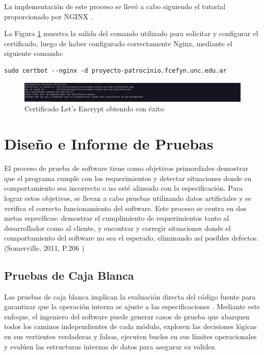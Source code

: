 La implementación de este proceso se llevó a cabo siguiendo el tutorial proporcionado por NGINX \cite{nginx-lestencript}.


La Figura \ref{fig:certificate-lets-encrypt} muestra la salida del comando utilizado para solicitar y configurar el certificado, luego de haber configurado correctamente Nginx, mediante el siguiente comando:

\begin{verbatim}
sudo certbot --nginx -d proyecto-patrocinio.fcefyn.unc.edu.ar
\end{verbatim}

\begin{figure}[h]
    \centering
    \includegraphics[width=1\linewidth]{fig/certificate-lets-encrypt.jpg}
    \caption{Certificado Let's Encrypt obtenido con éxito}
    \label{fig:certificate-lets-encrypt}
\end{figure}


\section{Diseño e Informe de Pruebas}

El proceso de prueba de software tiene como objetivos primordiales demostrar que el programa cumple con los requerimientos y detectar situaciones donde su comportamiento sea incorrecto o no esté alineado con la especificación. Para lograr estos objetivos, se llevan a cabo pruebas utilizando datos artificiales y se verifica el correcto funcionamiento del software. Este proceso se centra en dos metas específicas: demostrar el cumplimiento de requerimientos tanto al desarrollador como al cliente, y encontrar y corregir situaciones donde el comportamiento del software no sea el esperado, eliminando así posibles defectos. (Somerville, 2011, P.206 \cite{Somerville})

\subsection{Pruebas de Caja Blanca}

Las pruebas de caja blanca implican la evaluación directa del código fuente para garantizar que la operación interna se ajuste a las especificaciones \cite{Pressman}. Mediante este enfoque, el ingeniero del software puede generar casos de prueba que abarquen todos los caminos independientes de cada módulo, exploren las decisiones lógicas en sus vertientes verdaderas y falsas, ejecuten bucles en sus límites operacionales y evalúen las estructuras internas de datos para asegurar su validez.

